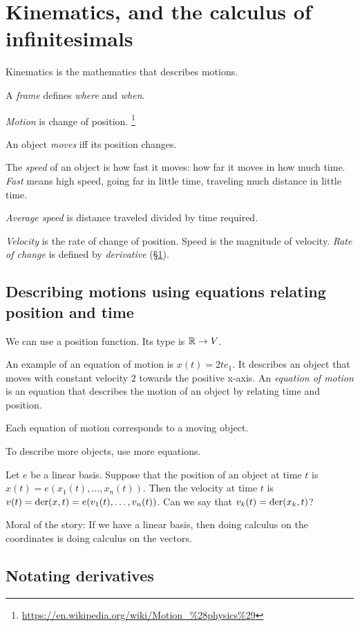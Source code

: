 \chapter{Kinematics, and the calculus of infinitesimals}
\label{sec:derivative}

Kinematics is the mathematics that describes motions.

A \emph{frame} defines \emph{where} and \emph{when}.

\emph{Motion} is change of position.%
\footnote{\url{https://en.wikipedia.org/wiki/Motion_\%28physics\%29}}

An object \emph{moves} iff its position changes.

The \emph{speed} of an object is how fast it moves:
how far it moves in how much time.
\emph{Fast} means high speed,
going far in little time,
traveling much distance in little time.

\emph{Average speed} is distance traveled divided by time required.

\emph{Velocity} is the rate of change of position.
Speed is the magnitude of velocity.
\emph{Rate of change} is defined by \emph{derivative} (\S\ref{sec:derivative}).

\section{Describing motions using equations relating position and time}

We can use a position function.
Its type is \( \mathbb{R} \to V \).

An example of an equation of motion is \( x(t) = 2 t e_1 \).
It describes an object that moves with constant velocity \(2\) towards the positive x-axis.
An \emph{equation of motion} is an equation that describes
the motion of an object by relating time and position.

Each equation of motion corresponds to a moving object.

To describe more objects, use more equations.

Let \(e\) be a linear basis.
Suppose that the position of an object at time \(t\) is
\(x(t) = e(x_1(t), \ldots, x_n(t))\).
Then the velocity at time \(t\) is \(v(t) = \operatorname{der}(x,t) = e(v_1(t), \ldots, v_n(t)) \).
Can we say that \(v_k(t) = \operatorname{der}(x_k,t)\)?

Moral of the story:
If we have a linear basis,
then doing calculus on the coordinates
is doing calculus on the vectors.

\section{Notating derivatives}

